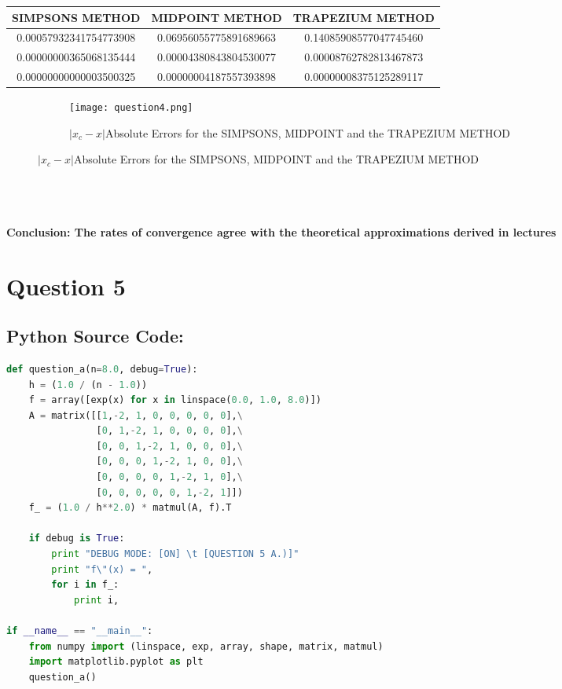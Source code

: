 \documentclass{article}
\begin{document}
\begin{center}
    \begin{tabular}{||c| c|| c||} 
    \hline
    \textbf{SIMPSONS METHOD} & \textbf{MIDPOINT METHOD} & \textbf{TRAPEZIUM METHOD}\\ [0.5ex] 
    \hline\hline
    0.00057932341754773908 & 0.06956055775891689663 & 0.14085908577047745460\\ [1ex] 
    \hline
    0.00000000365068135444 & 0.00004380843804530077 & 0.00008762782813467873\\ [1ex] 
    \hline
    0.00000000000003500325 & 0.00000004187557393898 & 0.00000008375125289117\\ [1ex] 
    \hline
    \end{tabular}
\end{center}

\begin{figure}[h!]
  \centering
  \begin{subfigure}{\linewidth}
    \texttt{[image: question4.png]}
    \caption{$|x_c - x|$Absolute Errors for the SIMPSONS, MIDPOINT and the TRAPEZIUM METHOD }
  \end{subfigure}
\end{figure}
\textbf{\\ \\ \\Conclusion: The rates of convergence agree with the theoretical
approximations derived in lectures}




\pagebreak
\section*{Question 5}
\subsection*{Python Source Code: }
\begin{lstlisting}[language=Python]
def question_a(n=8.0, debug=True):
    h = (1.0 / (n - 1.0))
    f = array([exp(x) for x in linspace(0.0, 1.0, 8.0)])
    A = matrix([[1,-2, 1, 0, 0, 0, 0, 0],\
                [0, 1,-2, 1, 0, 0, 0, 0],\
                [0, 0, 1,-2, 1, 0, 0, 0],\
                [0, 0, 0, 1,-2, 1, 0, 0],\
                [0, 0, 0, 0, 1,-2, 1, 0],\
                [0, 0, 0, 0, 0, 1,-2, 1]])
    f_ = (1.0 / h**2.0) * matmul(A, f).T

    if debug is True:
        print "DEBUG MODE: [ON] \t [QUESTION 5 A.)]"
        print "f\"(x) = ",
        for i in f_:
            print i,

if __name__ == "__main__":
    from numpy import (linspace, exp, array, shape, matrix, matmul)
    import matplotlib.pyplot as plt
    question_a()
\end{lstlisting}
\end{document}

